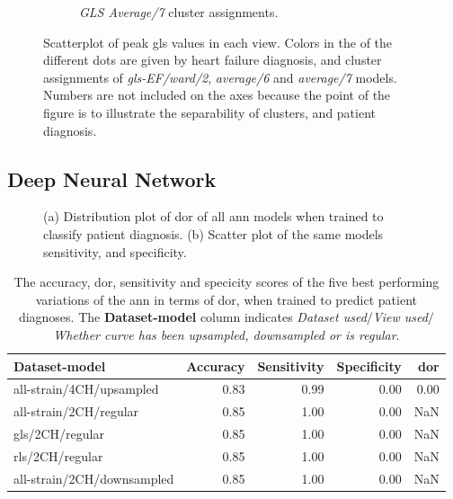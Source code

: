 \begin{figure}[H]
\begin{subfigure}[b]{0.49\textwidth}
        \caption{\textit{GLS Average/7} cluster assignments.}
        \label{fig:scatter_gls_average7}
    \end{subfigure}
    \caption{Scatterplot of peak \acrshort{gls} values in each view. Colors in the of the different dots are given by heart failure diagnosis, and cluster assignments of 
             \textit{gls-EF/ward/2}, \textit{average/6} and \textit{average/7} models. Numbers are not included on the axes because the point of the figure is to illustrate the separability 
             of clusters, and patient diagnosis.}
             \label{fig:scatter_gls_ind_cluster_assignments}
\end{figure}

\newpage

\subsection{Deep Neural Network}

\begin{figure}[H]
    \centering
    
    \caption{(a) Distribution plot of \acrshort{dor} of all \acrshort{ann} models when trained to classify patient diagnosis.
             (b) Scatter plot of the same models sensitivity, and specificity.}
    \label{fig:dl_ind_dor_sens_spec_dist}
\end{figure}

\begin{table}
    \centering
    \begin{tabular}{lrrrr}
        \toprule
        Dataset-model              &  Accuracy &  Sensitivity &  Specificity &  \acrshort{dor} \\
        \midrule
        all-strain/4CH/upsampled   &      0.83 &         0.99 &         0.00 & 0.00 \\
        all-strain/2CH/regular     &      0.85 &         1.00 &         0.00 &  NaN \\
        gls/2CH/regular            &      0.85 &         1.00 &         0.00 &  NaN \\
        rls/2CH/regular            &      0.85 &         1.00 &         0.00 &  NaN \\
        all-strain/2CH/downsampled &      0.85 &         1.00 &         0.00 &  NaN \\
        \bottomrule
    \end{tabular}
    \caption{The accuracy, \acrshort{dor}, sensitivity and specicity scores of the five best performing variations of the \acrshort{ann} in terms of \acrshort{dor}, when trained to predict patient diagnoses.
             The \textbf{Dataset-model} column indicates \textit{Dataset used}$/$\textit{View used}$/$\textit{Whether curve has been upsampled, downsampled or is regular}.}
    \label{tab:dl_hf_dor_sens_spec_dist}
\end{table}

